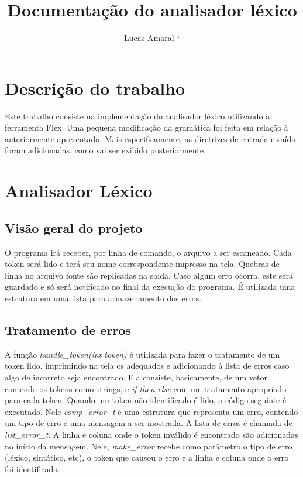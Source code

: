 \documentclass[11pt]{article}
\title{Documentação do analisador léxico}
\author{Lucas Amaral $^1$}
\begin{document}
\maketitle


\section{Descrição do trabalho}

Este trabalho consiste na implementação do analisador léxico utilizando a ferramenta Flex.
Uma pequena modificação da gramática foi feita em relação à anteriormente apresentada. 
Mais especificamente, as diretrizes de entrada e saída foram adicionadas, 
como vai ser exibido posteriormente.

\section{Analisador Léxico}

\subsection{Visão geral do projeto}

O programa irá receber, por linha de comando, o arquivo a ser escaneado. Cada token será
lido e terá seu nome correspondente impresso na tela. 
Quebras de linha no arquivo fonte são replicadas na saída. 
Caso algum erro ocorra, este será guardado e só será notificado no final da 
execução do programa. É utilizada uma estrutura em uma lista para armazenamento dos erros.

\subsection{Tratamento de erros}

A função \emph{handle\_token(int token)} é utilizada para fazer o tratamento de um token lido,
imprimindo na tela os adequados e adicionando à lista de erros caso algo de incorreto seja
encontrado. Ela consiste, basicamente, de um vetor contendo os tokens como strings, e \emph{if-then-else} com um tratamento
apropriado para cada token. Quando um token não identificado é lido, o código seguinte é 
executado. Nele \emph{comp\_error\_t} é uma estrutura que representa um erro, contendo um tipo de
erro e uma mensagem a ser mostrada. A lista de erros é chamada de \emph{list\_error\_t}. A linha
e coluna onde o token inválido é encontrado são adicionadas no início da mensagem. Nele,
\emph{make\_error} recebe como parâmetro o tipo de erro (léxico, sintático, etc), o token que causou o erro
e a linha e coluna onde o erro foi identificado.
\end{document}
